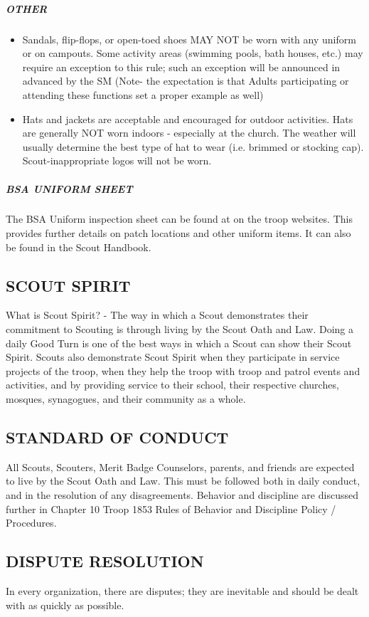\documentclass{ltxguide}
\begin{document}
\subparagraph{OTHER}
\begin{itemize}
	\item Sandals, flip-flops, or open-toed shoes MAY NOT be worn with any uniform or on campouts. Some activity areas (swimming pools, bath houses, etc.) may require an exception to this rule; such an exception will be announced in advanced by the \ac{SM} (Note- the expectation is that Adults participating or attending these functions set a proper example as well)
	\item Hats and jackets are acceptable and encouraged for outdoor activities. Hats are generally NOT worn indoors - especially at the church. The weather will usually determine the best type of hat to wear (i.e. brimmed or stocking cap). Scout-inappropriate logos will not be worn.
\end{itemize}

\subparagraph{\ac{BSA} UNIFORM SHEET}
The \ac{BSA} Uniform inspection sheet can be found at on the troop websites. This provides further details on patch  locations and other uniform items. It can also be found in the Scout Handbook.

\subsection{SCOUT SPIRIT}
What is Scout Spirit? - The way in which a Scout demonstrates their commitment to Scouting is through living by the Scout Oath and Law. Doing a daily Good Turn is one of the best ways in which a Scout can show their Scout Spirit. Scouts also demonstrate Scout Spirit when they participate in service projects of the troop, when they help the troop with troop and patrol events and activities, and by providing service to their school, their respective churches, mosques, synagogues, and their community as a whole.

\subsection{STANDARD OF CONDUCT}
All Scouts, Scouters, Merit Badge Counselors, parents, and friends are expected to live by the Scout Oath and Law. This must be followed both in daily conduct, and in the resolution of any disagreements. Behavior and discipline are discussed further in Chapter 10 Troop 1853 Rules of Behavior and Discipline Policy / Procedures.

\subsection{DISPUTE RESOLUTION}
In every organization, there are disputes; they are inevitable and should be dealt with as quickly as possible.
\end{document}
